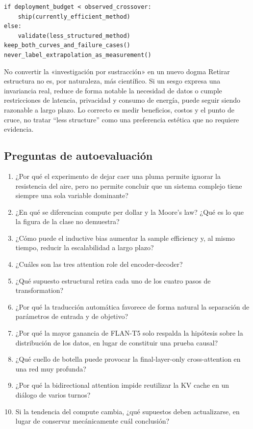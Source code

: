 \documentclass[a4paper]{article}
\begin{document}
\begin{lstlisting}[caption={Pseudocódigo de decisión para distinguir el óptimo actual de la tendencia de largo plazo}]
if deployment_budget < observed_crossover:
    ship(currently_efficient_method)
else:
    validate(less_structured_method)
keep_both_curves_and_failure_cases()
never_label_extrapolation_as_measurement()
\end{lstlisting}

\begin{warningbox}{No convertir la «investigación por sustracción» en un nuevo dogma}
Retirar estructura no es, por naturaleza, más científico. Si un sesgo expresa una invariancia real, reduce de forma notable la necesidad de datos o cumple restricciones de latencia, privacidad y consumo de energía, puede seguir siendo razonable a largo plazo. Lo correcto es medir beneficios, costos y el punto de cruce, no tratar ``less structure'' como una preferencia estética que no requiere evidencia.
\end{warningbox}

\subsection{Preguntas de autoevaluación}

\begin{enumerate}
  \item ¿Por qué el experimento de dejar caer una pluma permite ignorar la resistencia del aire, pero no permite concluir que un sistema complejo tiene siempre una sola variable dominante?
  \item ¿En qué se diferencian compute per dollar y la Moore's law? ¿Qué es lo que la figura de la clase no demuestra?
  \item ¿Cómo puede el inductive bias aumentar la sample efficiency y, al mismo tiempo, reducir la escalabilidad a largo plazo?
  \item ¿Cuáles son las tres attention role del encoder-decoder?
  \item ¿Qué supuesto estructural retira cada uno de los cuatro pasos de transformation?
  \item ¿Por qué la traducción automática favorece de forma natural la separación de parámetros de entrada y de objetivo?
  \item ¿Por qué la mayor ganancia de FLAN-T5 solo respalda la hipótesis sobre la distribución de los datos, en lugar de constituir una prueba causal?
  \item ¿Qué cuello de botella puede provocar la final-layer-only cross-attention en una red muy profunda?
  \item ¿Por qué la bidirectional attention impide reutilizar la KV cache en un diálogo de varios turnos?
  \item Si la tendencia del compute cambia, ¿qué supuestos deben actualizarse, en lugar de conservar mecánicamente cuál conclusión?
\end{enumerate}
\end{document}
